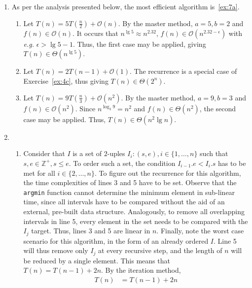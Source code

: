 \documentclass[12pt]{article}
\begin{document}
\begin{enumerate}
\begin{enumerate}
\begin{figure}[htbp]
    \end{figure}
  \end{enumerate}
  \item As per the analysis presented below, the most efficient algorithm is~\ref{ex:7a}.
  \begin{enumerate}
    \item\label{ex:7a} Let $T(n) = 5T(\frac{n}{2}) + \mathcal{O}(n)$. By the master method, $a = 5, b = 2$ and $f(n) \in \mathcal{O}(n)$. It occurs that $n^{\lg 5} \approx n^{2.32}$, $f(n) \in \mathcal{O}(n^{2.32 - \epsilon})$ with \emph{e.g.} $\epsilon > \lg 5 - 1$. Thus, the first case may be applied, giving $T(n) \in \Theta(n^{\lg 5})$.
    \item Let $T(n) = 2T(n - 1) + \mathcal{O}(1)$. The recurrence is a special case of Exercise~\ref{ex:4c}, thus giving $T(n) \in \Theta(2^{n})$.
    \item Let $T(n) = 9T(\frac{n}{3}) + \mathcal{O}(n^{2})$. By the master method, $a = 9, b = 3$ and $f(n) \in \mathcal{O}(n^{2})$. Since $n^{\log_{3} 9} = n^{2}$ and $f(n) \in \Theta(n^{2})$, the second case may be applied. Thus, $T(n) \in \Theta(n^{2} \lg n)$.
  \end{enumerate}
  \item
  \begin{enumerate}
    \item Consider that $I$ is a set of $2$-uples $I_{i} : (s, e), i \in \{1, \dots, n\}$ such that $s, e \in \mathbb{Z}^{+}, s \leq e$. To order such a set, the condition $I_{i - 1}.e < I_{i}.s$ has to be met for all $i \in \{2, \dots, n\}$. To figure out the recurrence for this algorithm, the time complexities of lines 3 and 5 have to be set. Observe that the \texttt{argmin} function cannot determine the minimum element in sub-linear time, since all intervals have to be compared without the aid of an external, pre-built data structure. Analogously, to remove all overlapping intervals in line 5, every element in the set needs to be compared with the $I_{j}$ target. Thus, lines 3 and 5 are linear in $n$. Finally, note the worst case scenario for this algorithm, in the form of an already ordered $I$. Line 5 will thus remove only $I_{j}$ at every recursive step, and the length of $n$ will be reduced by a single element. This means that $T(n) = T(n - 1) + 2n$. By the iteration method,
    \begin{align*}
      T(n) & = T(n - 1) + 2n           \\

\end{align*}
\end{enumerate}
\end{enumerate}
\end{document}
